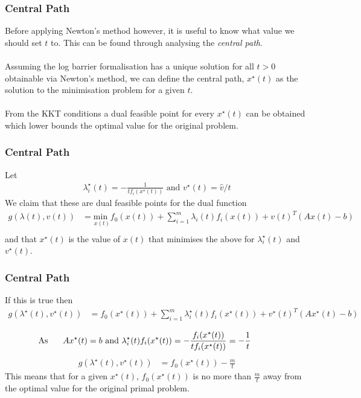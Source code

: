 \documentclass{beamer}
\begin{document}
\begin{frame}
    \frametitle{Central Path}
    Before applying Newton's method however, it is useful to know what value we
    should set $t$ to. This can be found through analysing the \textit{central
    path}.
    \\~\\
    Assuming the log barrier formalisation has a unique solution for all
    $t > 0$ obtainable via Newton's method, we can define the central path,
    $x^{\star}(t)$ as the solution to the minimisation problem for a given
    $t$.
    \\~\\
    From the KKT conditions a dual feasible point for every
    $x^{\star}(t)$ can be obtained which lower bounds the optimal value for
    the original problem.
\end{frame}

\begin{frame}
    \frametitle{Central Path}
    Let
    \begin{align*}
        \lambda_{i}^{\star}(t) = -\frac{1}{t f_{i}(x^{\star}(t))} \text{ and }
        v^{\star}(t) = \hat{v} / {t}
    \end{align*}
    We claim that these are dual feasible points for the dual function
    \begin{align*}
        g(\lambda(t), v(t)) &= \underset{x(t)}{\text{min }}f_{0}(x(t))
        + \sum\limits_{i=1}^{m}\lambda_{i}(t)f_{i}(x(t))
        + v(t)^{T}(Ax(t) - b) \\
    \end{align*}
    and that $x^{\star}(t)$ is the value of $x(t)$ that minimises the above for
    $\lambda_{i}^{\star}(t)$ and $v^{\star}(t)$.
\end{frame}

\begin{frame}
    \frametitle{Central Path}
    If this is true then
    {\footnotesize
        \begin{align*}
            g(\lambda^{\star}(t), v^{\star}(t)) &= f_{0}(x^{\star}(t))
            + \sum\limits_{i=1}^{m}\lambda_{i}^{\star}(t)f_{i}(x^{\star}(t))
            + v^{\star}(t)^{T}(Ax^{\star}(t) - b) \\
        \end{align*}
    }
    \vspace{-10mm}
    \begin{align*}
        \hspace{-10mm}\text{As }\hspace{5mm}  Ax^{\star}(t) = b \text{ and } \lambda_{i}^{\star}(t)f_{i}(x^{\star}(t))
        = -\frac{f_{i}(x^{\star}(t))}{t f_{i}(x^{\star}(t))}
        = -\frac{1}{t}
    \end{align*}
    \begin{align*}
        g(\lambda^{\star}(t), v^{\star}(t)) &= f_{0}(x^{\star}(t)) -
        \frac{m}{t}
    \end{align*}
    This means that for a given $x^{\star}(t)$, $f_{0}(x^{\star}(t))$ is no more than
    $\frac{m}{t}$ away from the optimal value for the original primal problem.
\end{frame}
\end{document}
